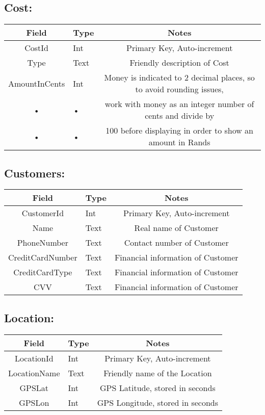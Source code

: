 \documentclass[10pt, onecolumn]{witseiepaper}
\begin{document}
\subsection*{Cost:}
\begin{tabular}{|c|l|c|}
\hline 
Field & Type & Notes\\ 
\hline 
CostId & Int & Primary Key, Auto-increment\\
\hline 
Type & Text & Friendly description of Cost\\
\hline 
AmountInCents & Int & Money is indicated to 2 decimal places, so to avoid rounding issues,\\
• & • & work with money as an integer number of cents and divide by\\ 
• & • & 100 before displaying in order to show an amount in Rands\\
\hline
\end{tabular}

\subsection*{Customers:}
\begin{tabular}{|c|l|c|}
\hline 
Field & Type & Notes\\ 
\hline 
CustomerId & Int & Primary Key, Auto-increment\\
\hline 
Name & Text & Real name of Customer\\
\hline
PhoneNumber & Text & Contact number of Customer\\
\hline
CreditCardNumber & Text & Financial information of Customer\\
\hline
CreditCardType & Text & Financial information of Customer\\
\hline
CVV & Text & Financial information of Customer\\
\hline
\end{tabular}

\subsection*{Location:}
\begin{tabular}{|c|l|c|}
\hline 
Field & Type & Notes\\ 
\hline 
LocationId & Int & Primary Key, Auto-increment\\
\hline 
LocationName & Text & Friendly name of the Location\\
\hline
GPSLat & Int & GPS Latitude, stored in seconds\\
\hline
GPSLon & Int & GPS Longitude, stored in seconds\\
\hline
\end{tabular}
\end{document}
